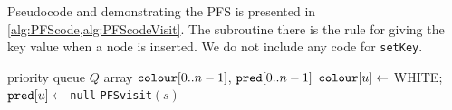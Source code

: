 %
%
%

Pseudocode  and  demonstrating the PFS is presented in \cref{alg:PFScode,alg:PFScodeVisit}. 
The subroutine  there is the rule for giving the key value when a node is inserted. 
We do not include any code for \texttt{setKey}.

\begin{algorithm}[H]
  \caption{Priority-first search algorithm.}
  \label{alg:PFScode}
\begin{algorithmic}[1]
	\State priority queue $Q$  
	\State array $\operatorname{\text{\texttt{colour}}}[0..n-1]$, $\operatorname{\text{\texttt{pred}}}[0..n-1]$
		\State $\operatorname{\text{\texttt{colour}}}[u] \gets $ WHITE; $\operatorname{\text{\texttt{pred}}}[u] \gets $ \texttt{null}
	\EndFor
			\State \texttt{PFSvisit}$(s)$
		\EndIf
	\EndFor
	\State \Return{$\pred$}
\EndFunction
\end{algorithmic}
\end{algorithm}

